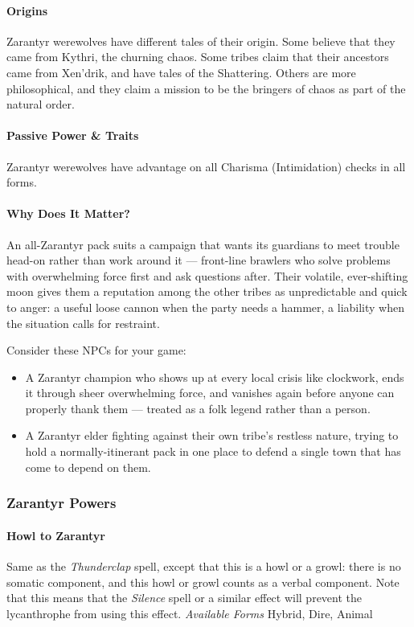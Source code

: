 \documentclass[twocolumn]{dndbook}
\begin{document}
\paragraph*{Origins} Zarantyr werewolves have different tales of their origin. Some believe that they came from Kythri, the churning chaos.
Some tribes claim that their ancestors came from Xen'drik, and have tales of the Shattering.
Others are more philosophical, and they claim a mission to be the bringers of chaos as part of the natural order.\par

\paragraph*{Passive Power \& Traits} Zarantyr werewolves have advantage on all Charisma (Intimidation) checks in all forms.

\paragraph*{Why Does It Matter?} An all-Zarantyr pack suits a campaign that wants its guardians to meet trouble head-on rather than work around it --- front-line brawlers who solve problems with overwhelming force first and ask questions after.
Their volatile, ever-shifting moon gives them a reputation among the other tribes as unpredictable and quick to anger: a useful loose cannon when the party needs a hammer, a liability when the situation calls for restraint.

Consider these NPCs for your game:
\begin{itemize}
    \item A Zarantyr champion who shows up at every local crisis like clockwork, ends it through sheer overwhelming force, and vanishes again before anyone can properly thank them --- treated as a folk legend rather than a person.
    \item A Zarantyr elder fighting against their own tribe's restless nature, trying to hold a normally-itinerant pack in one place to defend a single town that has come to depend on them.
\end{itemize}


\subsubsection{Zarantyr Powers}

\paragraph*{Howl to Zarantyr}
Same as the \emph{Thunderclap} spell, except that this is a howl or a growl: there is no somatic component, and this howl or growl counts as a verbal component.
Note that this means that the \emph{Silence} spell or a similar effect will prevent the lycanthrophe from using this effect.
\emph{Available Forms} Hybrid, Dire, Animal\par
\end{document}
